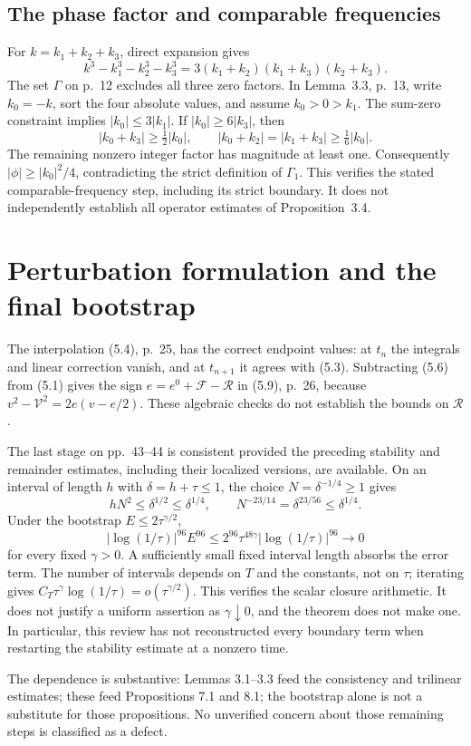 \documentclass[10pt]{article}
\begin{document}
\subsection*{The phase factor and comparable frequencies}
For \(k=k_1+k_2+k_3\), direct expansion gives \[k^3-k_1^3-k_2^3-k_3^3
 =3(k_1+k_2)(k_1+k_3)(k_2+k_3).\] The set \(\Gamma\) on p. 12 excludes all three zero factors. In Lemma 3.3, p. 13, write \(k_0=-k\), sort the four absolute values, and assume \(k_0>0>k_1\). The sum-zero constraint implies \(|k_0|\le3|k_1|\). If \(|k_0|\ge6|k_3|\), then \[|k_0+k_3|\ge\tfrac12|k_0|,\qquad
 |k_0+k_2|=|k_1+k_3|\ge\tfrac16|k_0|.\] The remaining nonzero integer factor has magnitude at least one. Consequently \(|\phi|\ge |k_0|^2/4\), contradicting the strict definition of \(\Gamma_1\). This verifies the stated comparable-frequency step, including its strict boundary. It does not independently establish all operator estimates of Proposition 3.4.\par
\section*{Perturbation formulation and the final bootstrap}
The interpolation (5.4), p. 25, has the correct endpoint values: at \(t_n\) the integrals and linear correction vanish, and at \(t_{n+1}\) it agrees with (5.3). Subtracting (5.6) from (5.1) gives the sign \(e=e^0+\mathcal F-\mathcal R\) in (5.9), p. 26, because \(v^2-\mathcal V^2=2e(v-e/2)\). These algebraic checks do not establish the bounds on \(\mathcal R\).\par
The last stage on pp. 43–44 is consistent provided the preceding stability and remainder estimates, including their localized versions, are available. On an interval of length \(h\) with \(\delta=h+\tau\le1\), the choice \(N=\delta^{-1/4}\ge1\) gives \[hN^2\le\delta^{1/2}\le\delta^{1/4},
 \qquad N^{-23/14}=\delta^{23/56}\le\delta^{1/4}.\] Under the bootstrap \(E\le2\tau^{\gamma/2}\), \[|\log(1/\tau)|^{96}E^{96}
 \le 2^{96}\tau^{48\gamma}|\log(1/\tau)|^{96}\longrightarrow0\] for every fixed \(\gamma>0\). A sufficiently small fixed interval length absorbs the error term. The number of intervals depends on \(T\) and the constants, not on \(\tau\); iterating gives \(C_T\tau^\gamma\log(1/\tau)=o(\tau^{\gamma/2})\). This verifies the scalar closure arithmetic. It does not justify a uniform assertion as \(\gamma\downarrow0\), and the theorem does not make one. In particular, this review has not reconstructed every boundary term when restarting the stability estimate at a nonzero time.\par
The dependence is substantive: Lemmas 3.1–3.3 feed the consistency and trilinear estimates; these feed Propositions 7.1 and 8.1; the bootstrap alone is not a substitute for those propositions. No unverified concern about those remaining steps is classified as a defect.\par
\end{document}
